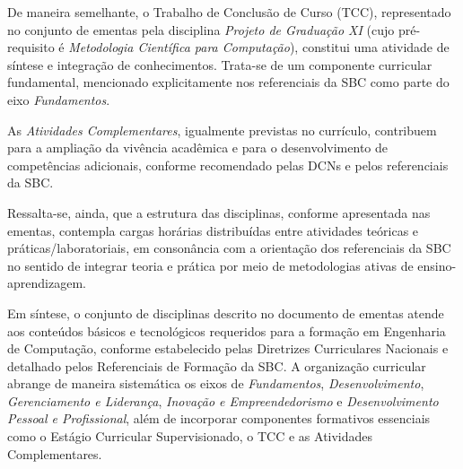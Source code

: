 De maneira semelhante, o Trabalho de Conclusão de Curso (TCC), representado no conjunto de ementas pela disciplina \textit{Projeto de Graduação XI} (cujo pré-requisito é \textit{Metodologia Científica para Computação}), constitui uma atividade de síntese e integração de conhecimentos. Trata-se de um componente curricular fundamental, mencionado explicitamente nos referenciais da SBC como parte do eixo \textit{Fundamentos}.

As \textit{Atividades Complementares}, igualmente previstas no currículo, contribuem para a ampliação da vivência acadêmica e para o desenvolvimento de competências adicionais, conforme recomendado pelas DCNs e pelos referenciais da SBC.

Ressalta-se, ainda, que a estrutura das disciplinas, conforme apresentada nas ementas, contempla cargas horárias distribuídas entre atividades teóricas e práticas/laboratoriais, em consonância com a orientação dos referenciais da SBC no sentido de integrar teoria e prática por meio de metodologias ativas de ensino-aprendizagem.

Em síntese, o conjunto de disciplinas descrito no documento de ementas atende aos conteúdos básicos e tecnológicos requeridos para a formação em Engenharia de Computação, conforme estabelecido pelas Diretrizes Curriculares Nacionais e detalhado pelos Referenciais de Formação da SBC. A organização curricular abrange de maneira sistemática os eixos de \textit{Fundamentos}, \textit{Desenvolvimento}, \textit{Gerenciamento e Liderança}, \textit{Inovação e Empreendedorismo} e \textit{Desenvolvimento Pessoal e Profissional}, além de incorporar componentes formativos essenciais como o Estágio Curricular Supervisionado, o TCC e as Atividades Complementares.


